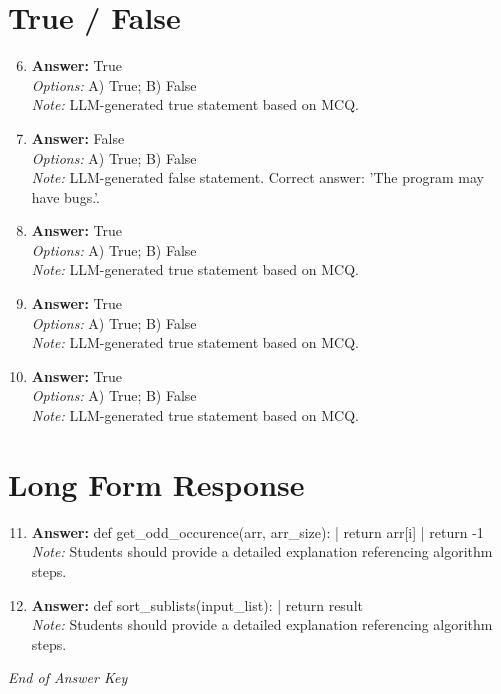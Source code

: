 \documentclass[12pt]{article}
\begin{document}
\section*{True / False}
\begin{enumerate}[label=\arabic*.]
\setcounter{enumi}{5}
\item \textbf{Answer:} True
\\ \textit{Options:} A) True; B) False
\\ \textit{Note:} LLM-generated true statement based on MCQ.
\item \textbf{Answer:} False
\\ \textit{Options:} A) True; B) False
\\ \textit{Note:} LLM-generated false statement. Correct answer: 'The program may have bugs.'.
\item \textbf{Answer:} True
\\ \textit{Options:} A) True; B) False
\\ \textit{Note:} LLM-generated true statement based on MCQ.
\item \textbf{Answer:} True
\\ \textit{Options:} A) True; B) False
\\ \textit{Note:} LLM-generated true statement based on MCQ.
\item \textbf{Answer:} True
\\ \textit{Options:} A) True; B) False
\\ \textit{Note:} LLM-generated true statement based on MCQ.
\end{enumerate}

\section*{Long Form Response}
\begin{enumerate}[label=\arabic*.]
\setcounter{enumi}{10}
\item \textbf{Answer:} def get\_odd\_occurence(arr, arr\_size): | return arr[i] | return -1
\\ \textit{Note:} Students should provide a detailed explanation referencing algorithm steps.
\item \textbf{Answer:} def sort\_sublists(input\_list): | return result
\\ \textit{Note:} Students should provide a detailed explanation referencing algorithm steps.
\end{enumerate}

\vfill
\noindent\textit{End of Answer Key}
\end{document}

